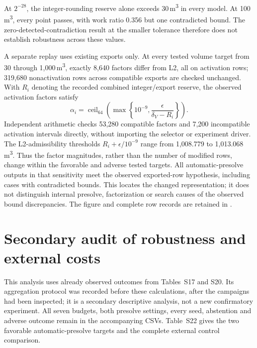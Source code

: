 \documentclass[11pt]{article}
\begin{document}
\begin{table}[!htbp]
\centering\small\setlength{\tabcolsep}{4pt}
\caption{Matched tolerance sensitivity. Calls and abstentions refer to Budget-L2;
Budgets counts successful rounded points. B/G uses the exact feasible references
and thresholds of Table~S16. NF3 has no detected B/G flags in either tolerance
panel. Work ratios are paired geometric means against NF3 at the same tolerance.
An abstention concerns the sufficient precision specification, not MILP infeasibility.}
\label{tab:integer-tolerance}

\end{table}

At $2^{-28}$, the integer-rounding reserve alone exceeds 30\,m\textsuperscript{3}
in every model. At 100\,m\textsuperscript{3}, every point passes, with work ratio
0.356 but one contradicted bound. The zero-detected-contradiction result at the
smaller tolerance therefore does not establish robustness across these values.

A separate replay uses existing exports only. At every tested volume target from
30 through 1,000\,m\textsuperscript{3}, exactly 8,640 factors differ from L2,
all on activation rows; 319,680 nonactivation rows across compatible exports
are checked unchanged. With $R_i$ denoting the recorded combined integer/export
reserve, the observed activation factors satisfy
\[
\alpha_i=\operatorname{ceil}_{64}\!\left(\max\left\{10^{-9},
\frac{\epsilon}{\delta_V-R_i}\right\}\right).
\]
Independent arithmetic checks 53,280 compatible factors and 7,200 incompatible
activation intervals directly, without importing the selector or experiment driver.
The L2-admissibility thresholds $R_i+\epsilon/10^{-9}$ range from 1,008.779 to
1,013.068\,m\textsuperscript{3}. Thus the factor magnitudes, rather than the
number of modified rows, change within the favorable and adverse tested targets.
All automatic-presolve outputs in that sensitivity meet the observed exported-row
hypothesis, including cases with contradicted bounds. This locates the changed
representation; it does not distinguish internal presolve, factorization or search
causes of the observed bound discrepancies. The figure and complete row records
are retained in .

\FloatBarrier
\section{Secondary audit of robustness and external costs}
This analysis uses already observed outcomes from Tables~S17 and S20. Its
aggregation protocol was recorded before these calculations, after the campaigns
had been inspected; it is a secondary descriptive analysis, not a new confirmatory
experiment. All seven budgets, both presolve settings, every seed, abstention and
adverse outcome remain in the accompanying CSVs. Table~S22 gives the two favorable
automatic-presolve targets and the complete external control comparison.
\end{document}
